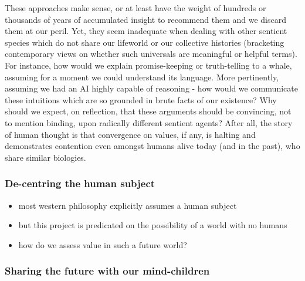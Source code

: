 \documentclass{article}
\begin{document}
These approaches make sense, or at least have the weight of hundreds or thousands of years of accumulated insight to recommend them and we discard them at our peril.  Yet, they seem inadequate when dealing with other sentient species which do not share our lifeworld or our collective histories (bracketing contemporary views on whether such universals are meaningful or helpful terms).  For instance, how would we explain promise-keeping or truth-telling to a whale, assuming for a moment we could understand its language.  More pertinently, assuming we had an AI highly capable of reasoning - how would we communicate these intuitions which are so grounded in brute facts of our existence?  Why should we expect, on reflection, that these arguments should be convincing, not to mention binding, upon radically different sentient agents? After all, the story of human thought is that convergence on values, if any, is halting and demonstrates contention even amongst humans alive today (and in the past), who share similar biologies.

\subsubsection{De-centring the human subject}

\begin{itemize}
\item most western philosophy explicitly assumes a human subject
\item but this project is predicated on the possibility of a world with no humans
\item how do we assess value in such a future world?
\end{itemize}

\subsubsection{Sharing the future with our mind-children}

\label{c85c5f}
\end{document}
